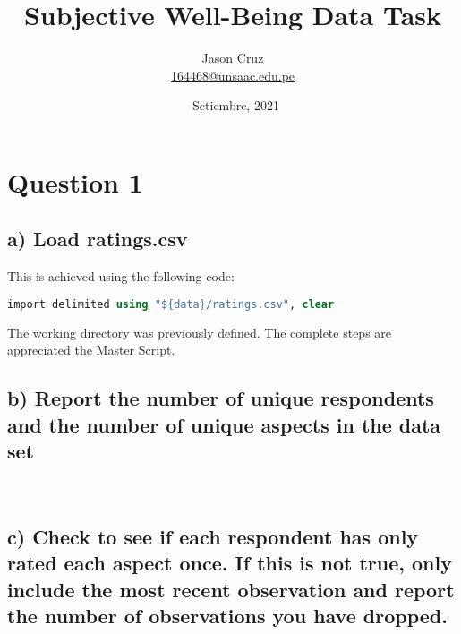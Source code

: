 \documentclass[12pt,a4paper]{article}
\title{\huge{Subjective Well-Being Data Task}}
\author{ 
	Jason Cruz\\ 
	\href{mailto:164468@unsaac.edu.pe}{164468@unsaac.edu.pe}
}
\date{\ Setiembre, 2021}
\begin{document}
	\maketitle 
	
	
\section*{{\textcolor[rgb]{0.0667, 0.1255, 0.1922}{Question 1}}}
	\subsection*{\normalsize{a) Load ratings.csv}}
	
	\noindent
	This is achieved using the following code:
	
	\begin{lstlisting}[language=Stata]
	import delimited using "${data}/ratings.csv", clear
	\end{lstlisting} 
	
	The working directory was previously defined. The complete steps are appreciated the Master Script.
	
	\subsection*{\normalsize{b) Report the number of unique respondents and the number of unique aspects in the data set}}
	
	\begin{table}[htbp]
	\end{table} \\
	
	\subsection*{\normalsize{c) Check to see if each respondent has only rated each aspect once. If this is not true, only include the most recent observation and report the number of observations you have dropped.}}
	
\end{document}
